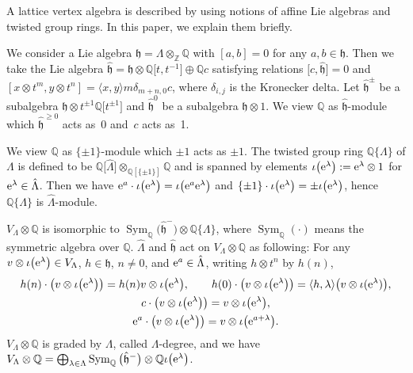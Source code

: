 \documentclass[pdftex]{sigma}%
\numberwithin{equation}{section}
\begin{document}
A lattice vertex algebra is described by using notions of affine Lie algebras and twisted group rings. In this paper, we explain them briefly.

We consider a Lie algebra $\mathfrak{h}=\Lambda\otimes_\mathbb{Z}\mathbb{Q}$ with $[a,b]=0$ for any $a,b\in \mathfrak{h}$. Then we take the Lie algebra $\hat{\mathfrak{h}}=\mathfrak{h}\otimes \mathbb{Q}\big[t,t^{-1}\big]\oplus \mathbb{Q}c$ satisfying relations $\big[c,\hat{\mathfrak{h}}\big]=0$ and $[x\otimes t^m, y\otimes t^n]=\langle x,y \rangle m\delta_{m+n,0}c$, where $\delta_{i,j}$ is the Kronecker delta.
Let $\hat{\mathfrak{h}}^{\pm}$ be a subalgebra $\mathfrak{h}\otimes t^{\pm1}\mathbb{Q}\big[t^{\pm1}\big]$ and $\hat{\mathfrak{h}}^0$ be a subalgebra $\mathfrak{h}\otimes 1$. We view $\mathbb{Q}$ as $\hat{\mathfrak{h}}$-module which $\hat{\mathfrak{h}}^{\geq 0}$ acts as~0 and~$c$ acts as~1.

We view $\mathbb{Q}$ as $\{\pm1\}$-module which $\pm1$ acts as $\pm1$. The twisted group ring $\mathbb{Q}\{\Lambda \}$ of $\Lambda$ is defined to be $\mathbb{Q}\big[\hat{\Lambda}\big]\otimes_{\mathbb{Q}[\{ \pm 1\}]}\mathbb{Q}$ and is spanned by elements $\iota \big({\rm e}^\lambda\big):={\rm e}^\lambda \otimes 1$ for ${\rm e}^\lambda \in \hat{\Lambda}$. Then we have ${\rm e}^a\cdot\iota\big({\rm e}^\lambda\big)=\iota\big({\rm e}^a{\rm e}^\lambda\big)$ and $\{\pm1\}\cdot\iota\big({\rm e}^\lambda\big)=\pm\iota\big({\rm e}^\lambda\big)$, hence $\mathbb{Q}\{\Lambda \}$ is $\hat{\Lambda}$-module.

$V_\Lambda\otimes \mathbb{Q}$ is isomorphic to $\operatorname{Sym}_{\mathbb{Q}}\big(\hat{\mathfrak{h}}^-\big)\otimes \mathbb{Q}\{\Lambda \}$, where $\operatorname{Sym}_{\mathbb{Q}}(\cdot)$ means the symmetric algebra over $\mathbb{Q}$.
$\hat{\Lambda}$ and $\hat{\mathfrak{h}}$ act on $V_\Lambda\otimes \mathbb{Q}$ as following: For any $v \otimes \iota\big({\rm e}^\lambda\big) \in V_\Lambda$, $h\in \mathfrak{h}$, $n\neq 0$, and ${\rm e}^a \in \hat{\Lambda}$, writing $h\otimes t^n$ by $h(n)$,
\begin{gather*}
h(n)\cdot \big(v \otimes \iota\big({\rm e}^\lambda\big)\big)=h(n)v \otimes \iota\big({\rm e}^\lambda\big),\qquad h(0)\cdot \big(v \otimes \iota\big({\rm e}^\lambda\big)\big)=\langle h,\lambda \rangle \big(v \otimes \iota({\rm e}^\lambda)\big), \\
c\cdot\big(v \otimes \iota\big({\rm e}^\lambda\big)\big)=v \otimes \iota\big({\rm e}^\lambda\big),\\
 {\rm e}^a\cdot \big(v \otimes \iota\big({\rm e}^\lambda\big)\big)=v \otimes \iota\big({\rm e}^{a+\lambda}\big).
\end{gather*}
 $V_\Lambda\otimes \mathbb{Q}$ is graded by $\Lambda$, called $\Lambda$-degree, and we have $V_\Lambda\otimes \mathbb{Q}=\bigoplus_{\lambda \in \Lambda} \operatorname{Sym}_{\mathbb{Q}}\big(\hat{\mathfrak{h}}^-\big)\otimes \mathbb{Q}\iota \big({\rm e}^\lambda\big)$.
\end{document}
